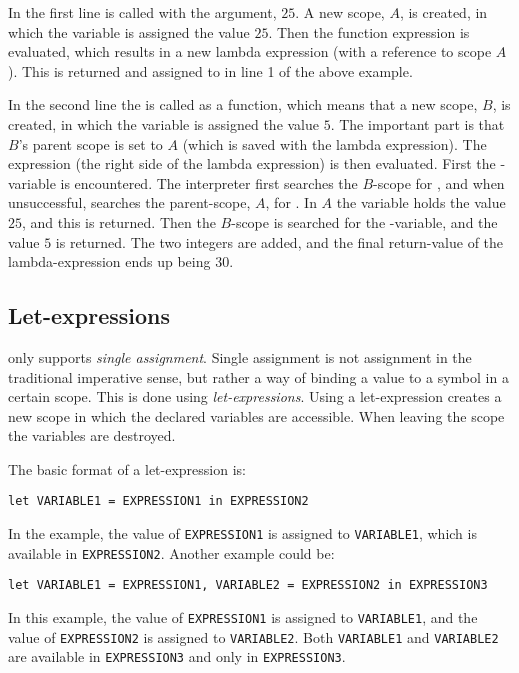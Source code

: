 
In the first line  is called with the argument, $25$. A new scope, $A$,
is created, in which the variable  is assigned the value $25$. Then the function
expression is evaluated, which results in a new lambda expression (with a reference to scope $A$).
This is returned and assigned to  in line 1 of the above example.

In the second line the  is called as a function, which means that a new scope, $B$,
is created, in which the variable  is assigned the value $5$. The important part is
that $B$'s parent scope is set to $A$ (which is saved with the lambda expression). The expression
(the right side of the lambda expression) is then evaluated. First the -variable is
encountered. The interpreter first searches the $B$-scope for , and when unsuccessful,
searches the parent-scope, $A$, for . In $A$ the variable  holds the value
$25$, and this is returned. Then the $B$-scope is searched for the -variable, and the value
$5$ is returned. The two integers are added, and the final return-value of the lambda-expression
ends up being $30$.

\subsection{Let-expressions}

\productname{} only supports \emph{single assignment}. Single assignment is not assignment
in the traditional imperative sense, but rather a way of binding a value to a symbol in a
certain scope. This is done using \emph{let-expressions}. Using a let-expression creates a
new scope in which the declared variables are accessible. When leaving the scope the
variables are destroyed.

The basic format of a let-expression is:

\texttt{let VARIABLE1 = EXPRESSION1 in EXPRESSION2}

In the example, the value of \texttt{EXPRESSION1} is assigned to \texttt{VARIABLE1}, which
is available in \texttt{EXPRESSION2}. Another example could be:

\texttt{let VARIABLE1 = EXPRESSION1, VARIABLE2 = EXPRESSION2 in EXPRESSION3}

In this example, the value of \texttt{EXPRESSION1} is assigned to \texttt{VARIABLE1}, and
the value of \texttt{EXPRESSION2} is assigned to \texttt{VARIABLE2}. Both \texttt{VARIABLE1}
and \texttt{VARIABLE2} are available in \texttt{EXPRESSION3} and only in \texttt{EXPRESSION3}.

